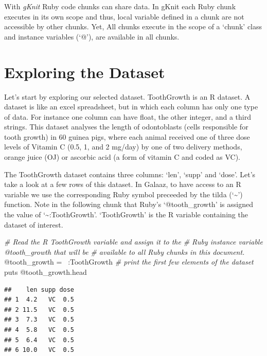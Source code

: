 \documentclass[11pt,]{article}
\newenvironment{Shaded}{\begin{snugshade}}{\end{snugshade}}
\newcommand{\StringTok}[1]{\textcolor[rgb]{0.31,0.60,0.02}{#1}}
\newcommand{\CommentTok}[1]{\textcolor[rgb]{0.56,0.35,0.01}{\textit{#1}}}
\newcommand{\OtherTok}[1]{\textcolor[rgb]{0.56,0.35,0.01}{#1}}
\newcommand{\NormalTok}[1]{#1}
\begin{document}
With \emph{gKnit} Ruby code chunks can share data. In gKnit each Ruby
chunk executes in its own scope and thus, local variable defined in a
chunk are not accessible by other chunks. Yet, All chunks execute in the
scope of a `chunk' class and instance variables (`@'), are available in
all chunks.

\section{Exploring the Dataset}\label{exploring-the-dataset}

Let's start by exploring our selected dataset. ToothGrowth is an R
dataset. A dataset is like an excel spreadsheet, but in which each
column has only one type of data. For instance one column can have
float, the other integer, and a third strings. This dataset analyses the
length of odontoblasts (cells responsible for tooth growth) in 60 guinea
pigs, where each animal received one of three dose levels of Vitamin C
(0.5, 1, and 2 mg/day) by one of two delivery methods, orange juice (OJ)
or ascorbic acid (a form of vitamin C and coded as VC).

The ToothGrowth dataset contains three columns: `len', `supp' and
`dose'. Let's take a look at a few rows of this dataset. In Galaaz, to
have access to an R variable we use the corresponding Ruby symbol
preceeded by the tilda (`\textasciitilde{}') function. Note in the
following chunk that Ruby's `@tooth\_growth' is assigned the value of
`\textasciitilde{}:ToothGrowth'. `ToothGrowth' is the R variable
containing the dataset of interest.

\begin{Shaded}
\begin{Highlighting}[]
\CommentTok{# Read the R ToothGrowth variable and assign it to the}
\CommentTok{# Ruby instance variable @tooth_growth that will be }
\CommentTok{# available to all Ruby chunks in this document.}
\OtherTok{@tooth_growth}\NormalTok{ = ~}\StringTok{:ToothGrowth}
\CommentTok{# print the first few elements of the dataset}
\NormalTok{puts }\OtherTok{@tooth_growth}\NormalTok{.head}
\end{Highlighting}
\end{Shaded}

\begin{verbatim}
##    len supp dose
## 1  4.2   VC  0.5
## 2 11.5   VC  0.5
## 3  7.3   VC  0.5
## 4  5.8   VC  0.5
## 5  6.4   VC  0.5
## 6 10.0   VC  0.5
\end{verbatim}
\end{document}
